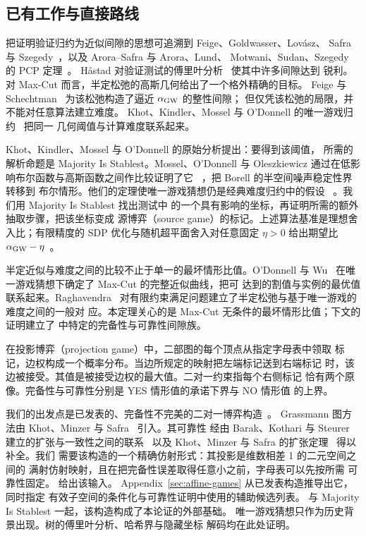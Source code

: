 \subsection*{已有工作与直接路线}

把证明验证归约为近似间隙的思想可追溯到 Feige、Goldwasser、Lov\'asz、
Safra 与 Szegedy~\cite{FGLSS96}，以及 Arora--Safra 与 Arora、Lund、
Motwani、Sudan、Szegedy 的 PCP 定理~\cite{AroraSafra98,ALMSS98}。
H\aa stad 对验证测试的傅里叶分析~\cite{Hastad01} 使其中许多间隙达到
锐利。对 Max-Cut 而言，半定松弛的高斯几何给出了一个格外精确的目标。
Feige 与 Schechtman~\cite{FS02} 为该松弛构造了逼近 $\alpha_{\mathrm{GW}}$ 的整性间隙；
但仅凭该松弛的局限，并不能对任意算法建立难度。
Khot、Kindler、Mossel 与 O'Donnell 的唯一游戏归约~\cite{KKMO07} 把同一
几何阈值与计算难度联系起来。

Khot、Kindler、Mossel 与 O'Donnell 的原始分析提出：要得到该阈值，
所需的解析命题是 Majority Is Stablest。Mossel、O'Donnell 与
Oleszkiewicz 通过在低影响布尔函数与高斯函数之间作比较证明了它
~\cite{MOO10}，把 Borell 的半空间噪声稳定性界~\cite{Borell85} 转移到
布尔情形。他们的定理使唯一游戏猜想仍是经典难度归约中的假设
~\cite[Corollary~2.12]{MOO10}。我们用 Majority Is Stablest 找出测试中
的一个具有影响的坐标，再证明所需的额外抽取步骤，把该坐标变成
源博弈（source game）的标记。上述算法基准是理想舍入比；有限精度的
SDP 优化与随机超平面舍入对任意固定 $\eta>0$ 给出期望比
$\alpha_{\mathrm{GW}}-\eta$~\cite[Section~2]{GW95}。

半定近似与难度之间的比较不止于单一的最坏情形比值。O'Donnell 与
Wu~\cite{OW08} 在唯一游戏猜想下确定了 Max-Cut 的完整近似曲线，把可
达到的割值与实例的最优值联系起来。Raghavendra~\cite{Raghavendra08}
对有限约束满足问题建立了半定松弛与基于唯一游戏的难度之间的一般对
应。本定理关心的是 Max-Cut 无条件的最坏情形比值；下文的证明建立了
 中特定的完备性与可靠性间隙族。

在投影博弈（projection game）中，二部图的每个顶点从指定字母表中领取
标记，边权构成一个概率分布。当边所规定的映射把左端标记送到右端标记
时，该边被接受。其值是被接受边权的最大值。二对一约束指每个右侧标记
恰有两个原像。完备性与可靠性分别是 YES 情形值的承诺下界与 NO 情形值
的上界。

我们的出发点是已发表的、完备性不完美的二对一博弈构造~\cite{DKKMS25}。
Grassmann 图方法由 Khot、Minzer 与 Safra~\cite{KMS25} 引入。其可靠性
经由 Barak、Kothari 与 Steurer 建立的扩张与一致性之间的联系~\cite{BKS19}
以及 Khot、Minzer 与 Safra 的扩张定理~\cite{KMS23} 得以补全。我们
需要该构造的一个精确仿射形式：其投影是维数相差 1 的二元空间之间的
满射仿射映射，且在把完备性误差取得任意小之前，字母表可以先按所需
可靠性固定。 给出该输入。
Appendix~\ref{sec:affine-games} 从已发表构造推导出它，同时指定
有效子空间的条件化与可靠性证明中使用的辅助候选列表。
与 Majority Is Stablest 一起，该构造构成了本论证的外部基础。
唯一游戏猜想只作为历史背景出现。树的傅里叶分析、哈希界与隐藏坐标
解码均在此处证明。

